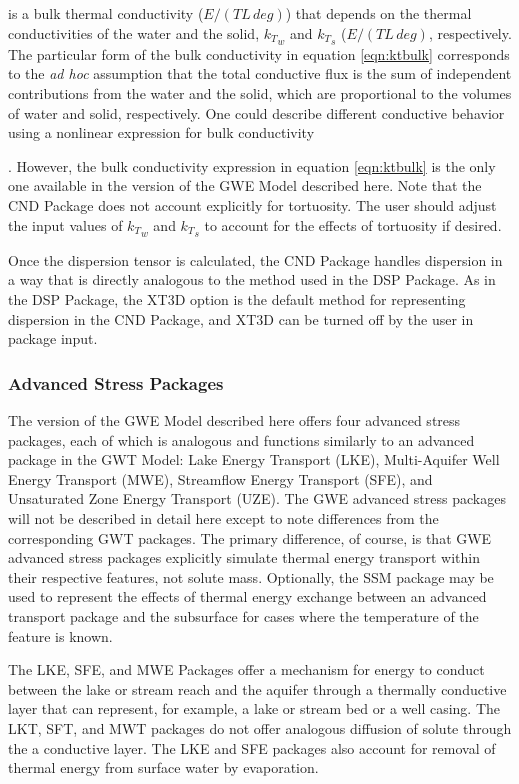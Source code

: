 \noindent is a bulk thermal conductivity ($E/(T L \, deg)$) that depends on the thermal conductivities of the water and the solid, ${k_T}_w$ and ${k_T}_s$  ($E/(T L \, deg)$, respectively. The particular form of the bulk conductivity in equation \ref{eqn:ktbulk} corresponds to the \textit{ad hoc} assumption that the total conductive flux is the sum of independent contributions from the water and the solid, which are proportional to the volumes of water and solid, respectively. One could describe different conductive behavior using a nonlinear expression for bulk conductivity {\citep{campbell1994, markle2006}.  However, the bulk conductivity expression in equation \ref{eqn:ktbulk} is the only one available in the version of the GWE Model described here. Note that the CND Package does not account explicitly for tortuosity. The user should adjust the input values of ${k_T}_w$ and ${k_T}_s$ to account for the effects of tortuosity if desired.

Once the dispersion tensor is calculated, the CND Package handles dispersion in a way that is directly analogous to the method used in the DSP Package. As in the DSP Package, the XT3D option is the default method for representing dispersion in the CND Package, and XT3D can be turned off by the user in package input.

\subsubsection{Advanced Stress Packages}

The version of the GWE Model described here offers four advanced stress packages, each of which is analogous and functions similarly to an advanced package in the GWT Model: Lake Energy Transport (LKE), Multi-Aquifer Well Energy Transport (MWE), Streamflow Energy Transport (SFE), and Unsaturated Zone Energy Transport (UZE). The GWE advanced stress packages will not be described in detail here except to note differences from the corresponding GWT packages. The primary difference, of course, is that GWE advanced stress packages explicitly simulate thermal energy transport within their respective features, not solute mass. Optionally, the SSM package may be used to represent the effects of thermal energy exchange between an advanced transport package and the subsurface for cases where the temperature of the feature is known.

The LKE, SFE, and MWE Packages offer a mechanism for energy to conduct between the lake or stream reach and the aquifer through a thermally conductive layer that can represent, for example,  a lake or stream bed or a well casing. The LKT, SFT, and MWT packages do not offer analogous diffusion of solute through the a conductive layer. The LKE and SFE packages also account for removal of thermal energy from surface water by evaporation.

}
